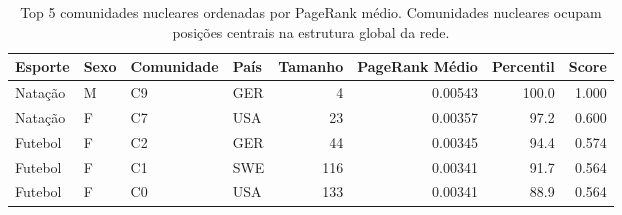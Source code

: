 \begin{table}[htbp]
\centering
\caption{Top 5 comunidades nucleares ordenadas por PageRank médio. Comunidades nucleares ocupam posições centrais na estrutura global da rede.}
\label{tab:nucleus_communities}
\begin{tabular}{llllrrrr}
\hline
Esporte & Sexo & Comunidade & País & Tamanho & PageRank Médio & Percentil & Score \\
\hline
Natação & M & C9 & GER & 4 & 0.00543 & 100.0 & 1.000 \\
Natação & F & C7 & USA & 23 & 0.00357 & 97.2 & 0.600 \\
Futebol & F & C2 & GER & 44 & 0.00345 & 94.4 & 0.574 \\
Futebol & F & C1 & SWE & 116 & 0.00341 & 91.7 & 0.564 \\
Futebol & F & C0 & USA & 133 & 0.00341 & 88.9 & 0.564 \\
\hline
\end{tabular}
\end{table}

